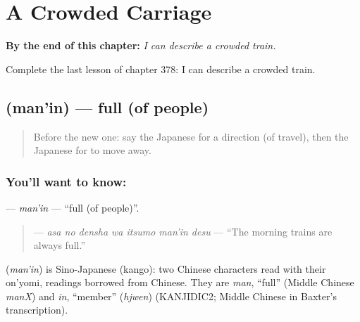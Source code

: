 
\chapter{A Crowded Carriage}
\label{ch:ja-a-crowded-carriage}

\begin{chapteropening}
\textbf{By the end of this chapter:} \emph{I can describe a crowded train.}

Complete the last lesson of chapter 378: I can describe a crowded train.
\end{chapteropening}

\section[\texorpdfstring{\ja{まんいん} (man'in)}{まんいん (man'in)}]{ (man'in) — full (of people)}

\label{lesson:JA-C378-man-in}



\begin{quote}
Before the new one: say the Japanese for a direction (of travel), then the Japanese for to move away.
\end{quote}

\subsection*{You'll want to know: }
\textbf{} — \emph{man'in} — \textquotedblleft{}full (of people)\textquotedblright{}.

\begin{quote}
\textbf{   } — \emph{asa no densha wa itsumo man'in desu} — \textquotedblleft{}The morning trains are always full.\textquotedblright{}
\end{quote}

\begin{cousinweb}
\textbf{} (\emph{man'in}) is Sino-Japanese (kango): two Chinese characters read with their on'yomi, readings borrowed from Chinese. They are \emph{man}, \textquotedblleft{}full\textquotedblright{} (Middle Chinese \emph{manX}) and \emph{in}, \textquotedblleft{}member\textquotedblright{} (\emph{hjwen}) (KANJIDIC2; Middle Chinese in Baxter's transcription).
\end{cousinweb}

